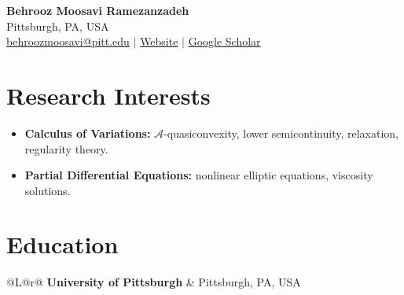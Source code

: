 \documentclass[11pt,letterpaper]{article}
\makeatletter
\newcommand{\cvline}[2]{%
  \begin{tabularx}{\linewidth}{@{}L@{\hspace{1.5em}}r@{}}
    #1 & #2
  \end{tabularx}\par}
\newcommand{\institution}[2]{\cvline{\textbf{\large #1}}{\normalsize #2}}
\newcommand{\linksep}{\hspace{1em}$\vert$\hspace{1em}}
\makeatother
\begin{document}
\begin{center}
  {\huge\bfseries Behrooz Moosavi Ramezanzadeh}\\[0.45em]
  {\small Pittsburgh, PA, USA}\\[0.30em]
  {\small
   \href{mailto:behroozmoosavi@pitt.edu}{behroozmoosavi@pitt.edu}
   \linksep
   \href{https://behroozmoosavi.github.io}{Website}
   \linksep
   \href{https://scholar.google.com/citations?user=gUWL4fIAAAAJ&hl=en}
        {Google Scholar}}
\end{center}

\section{Research Interests}

\begin{itemize}
  \item \textbf{Calculus of Variations:} $\mathscr{A}$-quasiconvexity, lower
        semicontinuity, relaxation, regularity theory.
  \item \textbf{Partial Differential Equations:} nonlinear elliptic equations,
        viscosity solutions.
\end{itemize}

\section{Education}

\institution{University of Pittsburgh}{Pittsburgh, PA, USA}
\end{document}
